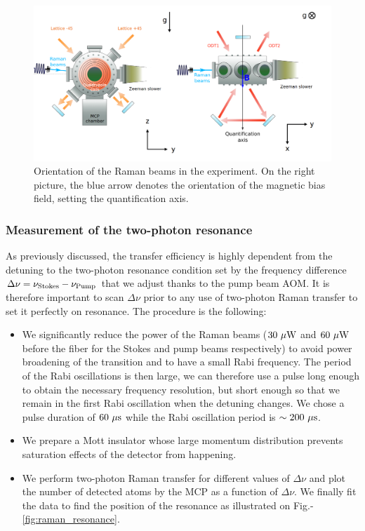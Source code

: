 \begin{figure}
    \centering
    \includegraphics[width=\textwidth]{Fig/Chapter3/raman_sc.png}
    \caption{Orientation of the Raman beams in the experiment. On the right picture, the blue arrow denotes the orientation of the magnetic bias field, setting the quantification axis.}
    \label{fig:raman_sc}
\end{figure}

\subsubsection{Measurement of the two-photon resonance}

As previously discussed, the transfer efficiency is highly dependent from the detuning to the two-photon resonance condition set by the frequency difference $\Delta \nu = \nu_{\rm{Stokes}} - \nu_{\rm{Pump}}$ that we adjust thanks to the pump  beam AOM. It is therefore important to scan $\Delta \nu$ prior to any use of two-photon Raman transfer to set it perfectly on resonance. The procedure is the following:

\begin{itemize}
    \item We significantly reduce the power of the Raman beams ($30 \ \mu \rm{W}$ and $60 \ \mu \rm{W}$ before the fiber for the Stokes and pump beams respectively) to avoid power broadening of the transition and to have a small Rabi frequency. The period of the Rabi oscillations is then large, we can therefore use a pulse long enough to obtain the necessary frequency resolution, but short enough so that we remain in the first Rabi oscillation when the detuning changes. We chose a pulse duration of $60 \ \mu \rm{s}$ while the Rabi oscillation period is $\sim 200 \ \mu \rm{s}$.
    \item We prepare a Mott insulator whose large momentum distribution prevents saturation effects of the detector from happening.
    \item We perform two-photon Raman transfer for different values of $\Delta \nu$ and plot the number of detected atoms by the MCP as a function of $\Delta \nu$. We finally fit the data to find the position of the resonance as illustrated on Fig.-\ref{fig:raman_resonance}.
\end{itemize}



